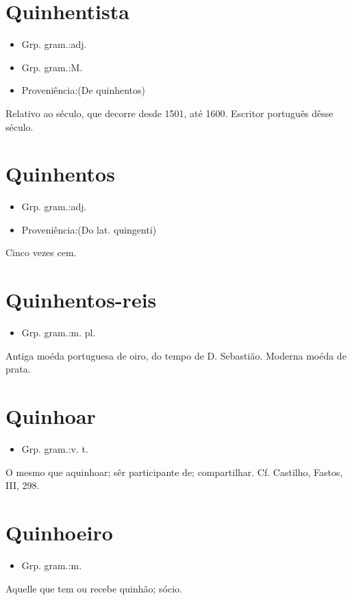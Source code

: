 \section{Quinhentista}
\begin{itemize}
\item {Grp. gram.:adj.}
\end{itemize}
\begin{itemize}
\item {Grp. gram.:M.}
\end{itemize}
\begin{itemize}
\item {Proveniência:(De \textunderscore quinhentos\textunderscore )}
\end{itemize}
Relativo ao século, que decorre desde 1501, até 1600.
Escritor português dêsse século.
\section{Quinhentos}
\begin{itemize}
\item {Grp. gram.:adj.}
\end{itemize}
\begin{itemize}
\item {Proveniência:(Do lat. \textunderscore quingenti\textunderscore )}
\end{itemize}
Cinco vezes cem.
\section{Quinhentos-reis}
\begin{itemize}
\item {Grp. gram.:m. pl.}
\end{itemize}
Antiga moéda portuguesa de oiro, do tempo de D. Sebastião.
Moderna moéda de prata.
\section{Quinhoar}
\begin{itemize}
\item {Grp. gram.:v. t.}
\end{itemize}
O mesmo que \textunderscore aquinhoar\textunderscore ; sêr participante de; compartilhar. Cf. Castilho, \textunderscore Fastos\textunderscore , III, 298.
\section{Quinhoeiro}
\begin{itemize}
\item {Grp. gram.:m.}
\end{itemize}
Aquelle que tem ou recebe quinhão; sócio.
